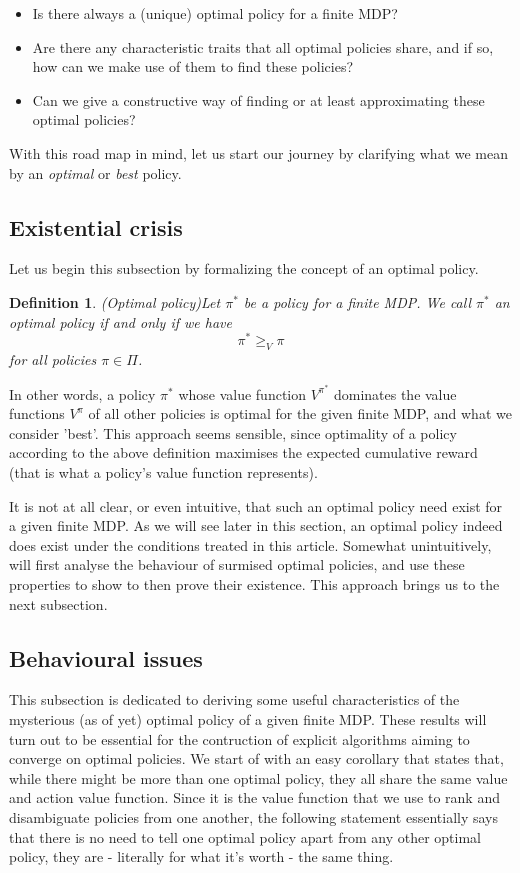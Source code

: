 \documentclass[11pt]{article} %
\newtheorem{defn}{Definition}
\begin{document}
\begin{itemize}
	\item Is there always a (unique) optimal policy for a finite MDP?
	\item Are there any characteristic traits that all optimal policies share, and if so, how can we make use of them to find these policies?
	\item Can we give a constructive way of finding or at least approximating these optimal policies?
\end{itemize}

With this road map in mind, let us start our journey by clarifying what we mean by an \textit{optimal} or \textit{best} policy.

\subsection{Existential crisis}

Let us begin this subsection by formalizing the concept of an optimal policy.

\begin{defn}{(Optimal policy)}\label{def_optPol}
	Let $\pi^*$ be a policy for a finite MDP. We call $\pi^*$ an \textit{optimal policy} if and only if we have $$\pi^* \ge_{V} \pi$$ for all policies $\pi \in \Pi$.
\end{defn}

In other words, a policy $\pi^*$ whose value function $V^{\pi^*}$ dominates the value functions $V^{\pi}$ of all other policies is optimal for the given finite MDP, and what we consider 'best'. This approach seems sensible, since optimality of a policy according to the above definition maximises the expected cumulative reward (that is what a policy's value function represents).

It is not at all clear, or even intuitive, that such an optimal policy need exist for a given finite MDP. As we will see later in this section, an optimal policy indeed does exist under the conditions treated in this article. Somewhat unintuitively, will first analyse the behaviour of surmised optimal policies, and use these properties to show to then prove their existence. This approach brings us to the next subsection.

\subsection{Behavioural issues}

This subsection is dedicated to deriving some useful characteristics of the mysterious (as of yet) optimal policy of a given finite MDP. These results will turn out to be essential for the contruction of explicit algorithms aiming to converge on optimal policies. We start of with an easy corollary that states that, while there might be more than one optimal policy, they all share the same value and action value function. Since it is the value function that we use to rank and disambiguate policies from one another, the following statement essentially says that there is no need to tell one optimal policy apart from any other optimal policy, they are - literally for what it's worth - the same thing.
\end{document}
